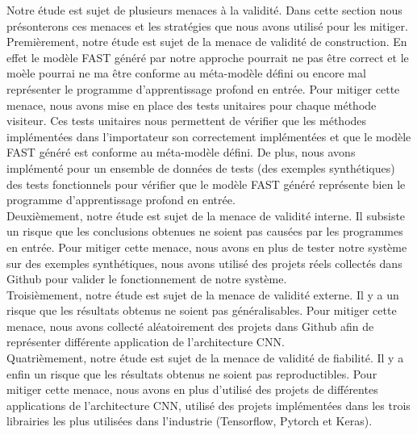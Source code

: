 \label{threats}
Notre étude est sujet de plusieurs menaces à la validité. Dans cette section
nous présonterons ces menaces et les stratégies que nous avons utilisé pour les
mitiger.\\

Premièrement, notre étude est sujet de la menace de validité de construction. En
effet le modèle FAST généré par notre approche pourrait ne pas être correct et
le moèle pourrai ne ma être conforme au méta-modèle défini ou encore mal
représenter le programme d'apprentissage profond en entrée. Pour mitiger cette
menace, nous avons mise en place des tests unitaires pour chaque méthode
visiteur. Ces tests unitaires nous permettent de vérifier que les méthodes
implémentées dans l'importateur son correctement implémentées et que le modèle
FAST généré est conforme au méta-modèle défini. De plus, nous avons implémenté
pour un ensemble de données de tests (des exemples synthétiques) des tests
fonctionnels pour vérifier que le modèle FAST généré représente bien le
programme d'apprentissage profond en entrée.\\

Deuxièmement, notre étude est sujet de la menace de validité interne. Il
subsiste un risque que les conclusions obtenues ne soient pas causées par les
programmes en entrée. Pour mitiger cette menace, nous avons en plus de tester
notre système sur des exemples synthétiques, nous avons utilisé des projets
réels collectés dans Github pour valider le fonctionnement de notre système.\\

Troisièmement, notre étude est sujet de la menace de validité externe. Il y a un
risque que les résultats obtenus ne soient pas généralisables. Pour mitiger
cette menace, nous avons collecté aléatoirement des projets dans Github afin de
représenter différente application de l'architecture CNN.\\

Quatrièmement, notre étude est sujet de la menace de validité de fiabilité. Il y
a enfin un risque que les résultats obtenus ne soient pas reproductibles. Pour
mitiger cette menace, nous avons en plus d'utilisé des projets de différentes
applications de l'architecture CNN, utilisé des projets implémentées dans les
trois librairies les plus utilisées dans l'industrie (Tensorflow, Pytorch et Keras).



















